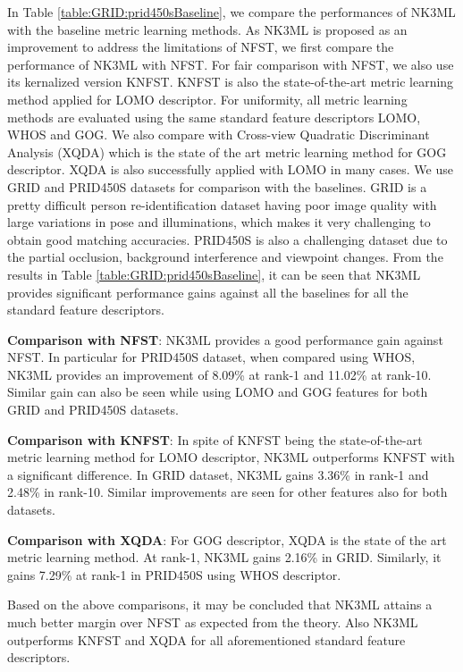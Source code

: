 \documentclass[runningheads]{llncs}
\begin{document}
In Table \ref{table:GRID:prid450sBaseline}, we compare the performances of NK3ML with the baseline metric learning methods. As NK3ML is proposed as an  improvement to address the limitations of NFST, we first compare the performance of NK3ML with NFST. For fair comparison with NFST, we also use its kernalized version KNFST\cite{Zheng:nfst}. KNFST is also the state-of-the-art metric learning method applied for LOMO descriptor. For uniformity, all metric learning methods are evaluated using the same standard feature descriptors LOMO\cite{LOMO}, WHOS\cite{LisantiPAMI14} and GOG\cite{GOG}.
 We also compare with Cross-view Quadratic Discriminant Analysis (XQDA)\cite{GOG} which is the state of the art metric learning method for GOG descriptor. XQDA is also successfully applied with LOMO in many cases\cite{LOMO}. We use GRID and PRID450S datasets for comparison with the baselines. GRID is a pretty difficult person re-identification dataset having poor image quality with large variations in pose and illuminations, which makes it very challenging to obtain good matching accuracies. PRID450S is also a challenging dataset due to the partial occlusion, background interference and viewpoint changes. From the results in Table \ref{table:GRID:prid450sBaseline}, it can be seen that NK3ML provides significant performance gains against all the baselines for all the standard feature descriptors. 

 

\setlength{\parskip}{0.5mm}
\noindent\textbf{Comparison with NFST}: NK3ML provides a good performance gain against NFST. In particular for PRID450S dataset, when compared using WHOS, NK3ML provides an improvement of 8.09\% at rank-1 and 11.02\% at rank-10.
Similar gain can also be seen while using LOMO and GOG features for both GRID and PRID450S datasets.

\noindent\textbf{Comparison with KNFST}: In spite of KNFST being the state-of-the-art metric learning method for LOMO descriptor, NK3ML outperforms KNFST with a significant difference. In GRID dataset, NK3ML gains 3.36\% in rank-1
and 2.48\% in rank-10. 
Similar improvements are seen for other features also for both datasets.

\noindent\textbf{Comparison with XQDA}: For GOG descriptor, XQDA is the state of the art metric learning method. At rank-1, NK3ML gains 2.16\% in GRID.
Similarly, it gains 7.29\% at rank-1 in PRID450S using WHOS descriptor.


\setlength{\parskip}{0mm}
Based on the above comparisons, it may be concluded that NK3ML attains a much better margin over NFST as expected from the theory.  Also NK3ML outperforms KNFST and XQDA for all aforementioned standard feature descriptors. 
\end{document}
